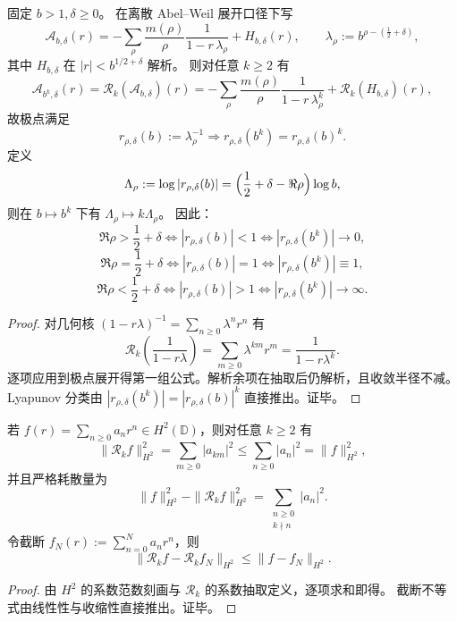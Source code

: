 \begin{theorem}\label{thm:xi-abel-pole-divisor-powermap-lyapunov}
固定 \(b>1,\delta\ge 0\)。
在离散 Abel--Weil 展开口径下写
\[
\mathcal A_{b,\delta}(r)
=-\sum_{\rho}\frac{m(\rho)}{\rho}\frac{1}{1-r\,\lambda_\rho}
+H_{b,\delta}(r),
\qquad
\lambda_\rho:=b^{\rho-(\frac12+\delta)},
\]
其中 \(H_{b,\delta}\) 在 \(|r|<b^{1/2+\delta}\) 解析。
则对任意 \(k\ge 2\) 有
\[
\mathcal A_{b^k,\delta}(r)
=\mathcal R_k(\mathcal A_{b,\delta})(r)
=-\sum_{\rho}\frac{m(\rho)}{\rho}\frac{1}{1-r\,\lambda_\rho^k}
+\mathcal R_k(H_{b,\delta})(r),
\]
故极点满足
\[
r_{\rho,\delta}(b):=\lambda_\rho^{-1}
\Longrightarrow
r_{\rho,\delta}(b^k)=r_{\rho,\delta}(b)^k.
\]
定义
\[
\Lambda_\rho:=\log|r_{\rho,\delta}(b)|=\Bigl(\frac12+\delta-\Re\rho\Bigr)\log b,
\]
则在 \(b\mapsto b^k\) 下有 \(\Lambda_\rho\mapsto k\Lambda_\rho\)。
因此：
\[
\Re\rho>\frac12+\delta\Longleftrightarrow |r_{\rho,\delta}(b)|<1\Longleftrightarrow |r_{\rho,\delta}(b^k)|\to 0,
\]
\[
\Re\rho=\frac12+\delta\Longleftrightarrow |r_{\rho,\delta}(b)|=1\Longleftrightarrow |r_{\rho,\delta}(b^k)|\equiv 1,
\]
\[
\Re\rho<\frac12+\delta\Longleftrightarrow |r_{\rho,\delta}(b)|>1\Longleftrightarrow |r_{\rho,\delta}(b^k)|\to \infty.
\]
\end{theorem}
\begin{proof}
对几何核 \((1-r\lambda)^{-1}=\sum_{n\ge 0}\lambda^n r^n\) 有
\[
\mathcal R_k\!\left(\frac{1}{1-r\lambda}\right)
=\sum_{m\ge 0}\lambda^{km}r^m
=\frac{1}{1-r\lambda^k}.
\]
逐项应用到极点展开得第一组公式。解析余项在抽取后仍解析，且收敛半径不减。
Lyapunov 分类由
\(
|r_{\rho,\delta}(b^k)|=|r_{\rho,\delta}(b)|^k
\)
直接推出。证毕。
\end{proof}

\begin{proposition}\label{prop:xi-abel-H2-contraction-truncation-noamplify}
若 \(f(r)=\sum_{n\ge 0}a_n r^n\in H^2(\mathbb D)\)，则对任意 \(k\ge 2\) 有
\[
\|\mathcal R_k f\|_{H^2}^2=\sum_{m\ge 0}|a_{km}|^2\le \sum_{n\ge 0}|a_n|^2=\|f\|_{H^2}^2,
\]
并且严格耗散量为
\[
\|f\|_{H^2}^2-\|\mathcal R_k f\|_{H^2}^2
=\sum_{\substack{n\ge 0\\k\nmid n}}|a_n|^2.
\]
令截断 \(f_N(r):=\sum_{n=0}^{N}a_n r^n\)，则
\[
\|\mathcal R_k f-\mathcal R_k f_N\|_{H^2}\le \|f-f_N\|_{H^2}.
\]
\end{proposition}
\begin{proof}
由 \(H^2\) 的系数范数刻画与 \(\mathcal R_k\) 的系数抽取定义，逐项求和即得。
截断不等式由线性性与收缩性直接推出。证毕。
\end{proof}

